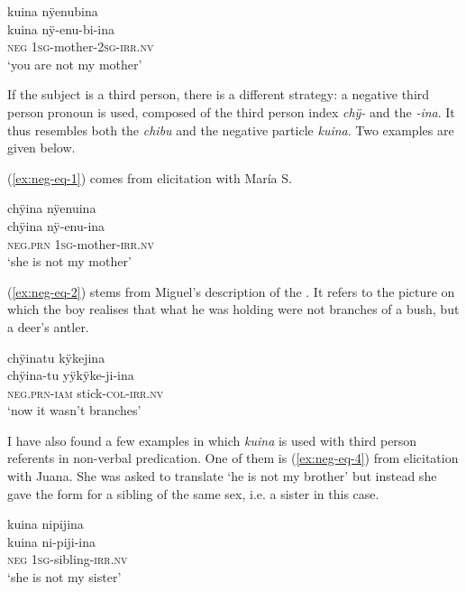 \ea\label{ex:not-mother-2}
\begingl
\glpreamble kuina nÿenubina\\
\gla kuina nÿ-enu-bi-ina\\
\glb \textsc{neg} 1\textsc{sg}-mother-2\textsc{sg}-\textsc{irr.nv}\\
\glft ‘you are not my mother’
\endgl
\trailingcitation{[jxx-p150920l.052]}
\xe

If the subject is a third person, there is a different strategy: a negative third person pronoun is used, composed of the third person index \textit{chÿ-} and the  \textit{-ina}. It thus resembles both the  \textit{chibu} and the negative particle \textit{kuina}. Two examples are given below.

(\ref{ex:neg-eq-1}) comes from elicitation with María S.

\ea\label{ex:neg-eq-1}
\begingl
\glpreamble chÿina nÿenuina\\
\gla chÿina nÿ-enu-ina\\
\textsc{neg.prn} 1\textsc{sg}-mother-\textsc{irr.nv}\\
\glft ‘she is not my mother’
\endgl
\trailingcitation{[rmx-e150922l.099]}
\xe

(\ref{ex:neg-eq-2}) stems from Miguel’s description of the . It refers to the picture on which the boy realises that what he was holding were not branches of a bush, but a deer’s antler.

\ea\label{ex:neg-eq-2}
\begingl
\glpreamble chÿinatu kÿkejina\\
\gla chÿina-tu yÿkÿke-ji-ina\\
\textsc{neg.prn}-\textsc{iam} stick-\textsc{col}-\textsc{irr.nv}\\
\glft ‘now it wasn’t branches’
\endgl
\trailingcitation{[mox-a110920l-2.129]}
\xe

I have also found a few examples in which \textit{kuina} is used with third person referents in non-verbal predication. One of them is (\ref{ex:neg-eq-4}) from elicitation with Juana. She was asked to translate ‘he is not my brother’ but instead she gave the form for a sibling of the same sex, i.e. a sister in this case.

\ea\label{ex:neg-eq-4}
\begingl
\glpreamble kuina nipijina\\
\gla kuina ni-piji-ina\\
\glb \textsc{neg} 1\textsc{sg}-sibling-\textsc{irr.nv}\\
\glft ‘she is not my sister’
\endgl
\trailingcitation{[jxx-p150920l.053]}
\xe
{}

